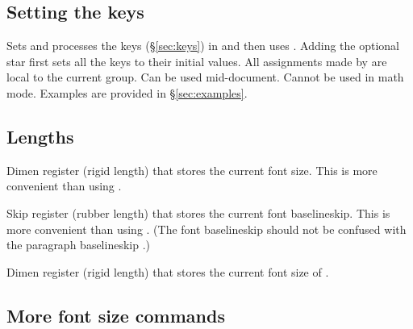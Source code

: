 \documentclass{beerydoc}
\begin{document}
\subsection{Setting the keys}
\label{subsec:setup}

\begin{codedoc}{\fontscalesetup}
  \begin{syntax}
     \sarg{} 
  \end{syntax}
  Sets and processes the  keys (\S\ref{sec:keys}) in
   and then uses .
  Adding the optional star first sets all the  keys to their
  initial values.
  All assignments made by  are local to the current group.
  Can be used mid-document.
  Cannot be used in math mode.
  Examples are provided in \S\ref{sec:examples}.
\end{codedoc}

\subsection{Lengths}
\label{subsec:lengths}

\begin{codedoc}{\currentfontsize}
  Dimen register (rigid length) that stores the current font size.
  This is more convenient than using .
\end{codedoc}

\begin{codedoc}{\currentfontbaselineskip}
  Skip register (rubber length) that stores the current font baselineskip.
  This is more convenient than using .
  (The font baselineskip should not be confused with the paragraph baselineskip
  .)
\end{codedoc}

\begin{codedoc}{\currentnormalsize}
  Dimen register (rigid length) that stores the current font size of
  .
\end{codedoc}

\subsection{More font size commands}
\label{subsec:fontsize}
\end{document}
